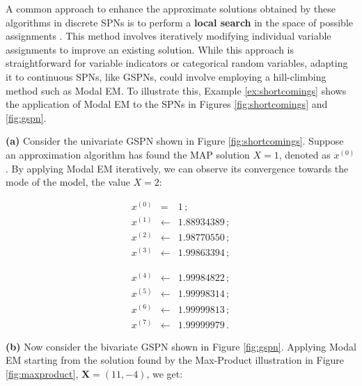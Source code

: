 A common approach to enhance the approximate solutions obtained by these algorithms in discrete SPNs is to perform a \textbf{local search} in the space of possible assignments \citep{Maua2020}. This method involves iteratively modifying individual variable assignments to improve an existing solution. While this approach is straightforward for variable indicators or categorical random variables, adapting it to continuous SPNs, like GSPNs, could involve employing a hill-climbing method such as Modal EM. To illustrate this, Example \ref{ex:shortcomings} shows the application of Modal EM to the SPNs in Figures \ref{fig:shortcomings} and \ref{fig:gspn}.

\begin{example}
  \label{ex:shortcomings}
  \textbf{(a)} Consider the univariate GSPN shown in Figure \ref{fig:shortcomings}. Suppose an approximation algorithm has found the MAP solution $X = 1$, denoted as $x^{(0)}$. By applying Modal EM iteratively, we can observe its convergence towards the mode of the model, the value $X = 2$:

  \begin{minipage}{0.45\textwidth}
    \begin{eqnarray*}
      x^{(0)} & = & 1 \, ; \\
      x^{(1)} & \gets & 1.88934389 \, ; \\
      x^{(2)} & \gets & 1.98770550 \, ; \\
      x^{(3)} & \gets & 1.99863394 \, ;
    \end{eqnarray*}
  \end{minipage}\begin{minipage}{0.45\textwidth}
    \begin{eqnarray*}
      x^{(4)} & \gets & 1.99984822 \, ; \\
      x^{(5)} & \gets & 1.99998314 \, ; \\
      x^{(6)} & \gets & 1.99999813 \, ; \\
      x^{(7)} & \gets & 1.99999979 \, .
    \end{eqnarray*}
  \end{minipage}

  \vspace{1.5em}

  \noindent \textbf{(b)} Now consider the bivariate GSPN shown in Figure \ref{fig:gspn}. Applying Modal EM starting from the solution found by the Max-Product illustration in Figure \ref{fig:maxproduct}, $\mathbf{X} = (11, -4)$, we get:


\end{example}
